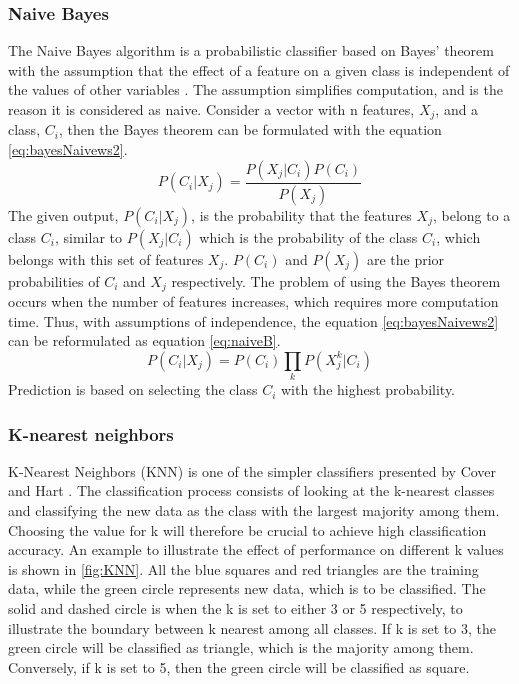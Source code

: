 \documentclass[USenglish]{ifimaster}  %
\begin{document}
\subsubsection{Naive Bayes}
The Naive Bayes algorithm is a probabilistic classifier based on Bayes’ theorem with the assumption that the effect of a feature on a given class is independent of the values of other variables \cite{Marsland:2009:MLA:1571643}. The assumption simplifies computation, and is the reason it is considered as naive. Consider a vector with n features, $X_j$, and a class, $C_i$, then the Bayes theorem can be formulated with the equation \ref{eq:bayesNaivews2}.
\begin{equation} 
P(C_i \vert X_j) = \frac{P(X_j \vert C_i)P(C_i)}{P(X_j)}
\label{eq:bayesNaivews2}
\end{equation}
The given output, $P(C_i \vert X_j)$, is the probability that the features $X_j$, belong to a class $C_i$, similar to $P(X_j \vert C_i)$ which is the probability of the class $C_i$, which belongs with this set of features $X_j$.  $P(C_i)$ and $P(X_j)$ are the prior probabilities of $C_i$ and  $X_j$ respectively. The problem of using the Bayes theorem occurs when the number of features increases, which requires more computation time. Thus, with assumptions of independence, the equation \ref{eq:bayesNaivews2} can be reformulated as equation \ref{eq:naiveB}.
\begin{equation} 
P(C_i \vert X_j)  = P(C_i)\prod_{k}P(X_{j}^{k} \vert C_i)
\label{eq:naiveB}
\end{equation}
Prediction is based on selecting the class $C_i$ with the highest probability.

\subsubsection{K-nearest neighbors}
K-Nearest Neighbors (KNN) is one of the simpler classifiers presented by Cover and Hart \cite{1053964}. The classification process consists of looking at the k-nearest classes and classifying the new data as the class with the largest majority among them. Choosing the value for k will therefore be crucial to achieve high classification accuracy. An example to illustrate the effect of performance on different k values is shown in \ref{fig:KNN}. All the blue squares and red triangles are the training data, while the green circle represents new data, which is to be classified. The solid and dashed circle is when the k is set to either 3 or 5 respectively, to illustrate the boundary between k nearest among all classes. If k is set to 3, the green circle will be classified as triangle, which is the majority among them. Conversely, if k is set to 5, then the green circle will be classified as square.
\end{document}
